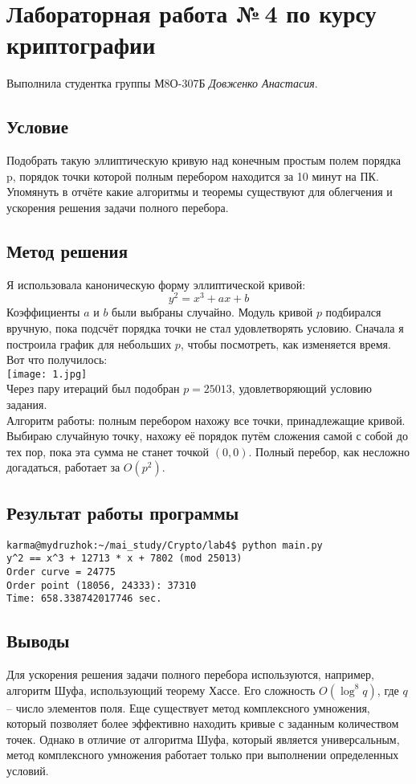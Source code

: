\documentclass[12pt]{article}
\begin{document}
\section*{Лабораторная работа №\,4 по курсу криптографии}

Выполнила студентка группы М8О-307Б \textit{Довженко Анастасия}.

\subsection*{Условие}
Подобрать такую эллиптическую кривую над конечным простым полем порядка p, порядок точки которой полным перебором находится за 10 минут на ПК. Упомянуть в отчёте какие алгоритмы и теоремы существуют для облегчения и ускорения решения задачи полного перебора.

\subsection*{Метод решения}
Я использовала каноническую форму эллиптической кривой:
$$ y^{2} = x^{3} + ax + b$$
Коэффициенты $a$ и $b$ были выбраны случайно. Модуль кривой $p$ подбирался вручную, пока подсчёт порядка точки не стал удовлетворять условию. Сначала я построила график для небольших $p$, чтобы посмотреть, как изменяется время. Вот что получилось:\\
\texttt{[image: 1.jpg]}\\
Через пару итераций был подобран $p = 25013$, удовлетворяющий условию задания.\\

Алгоритм работы: полным перебором нахожу все точки, принадлежащие кривой. Выбираю случайную точку, нахожу её порядок путём сложения самой с собой до тех пор, пока эта сумма не станет точкой $(0, 0)$. Полный перебор, как несложно догадаться, работает за $O(p^{2})$.


\subsection*{Результат работы программы}
\begin{lstlisting}
karma@mydruzhok:~/mai_study/Crypto/lab4$ python main.py 
y^2 == x^3 + 12713 * x + 7802 (mod 25013)
Order curve = 24775
Order point (18056, 24333): 37310
Time: 658.338742017746 sec.
\end{lstlisting}

\subsection*{Выводы}
Для ускорения решения задачи полного перебора используются, например, алгоритм Шуфа, использующий теорему Хассе. Его сложность $O(\log^{8}q)$, где $q$ -- число элементов поля. Еще существует метод комплексного умножения, который позволяет более эффективно находить кривые с заданным количеством точек. Однако в отличие от алгоритма Шуфа, который является универсальным, метод комплексного умножения работает только при выполнении определенных условий. 
\end{document}
